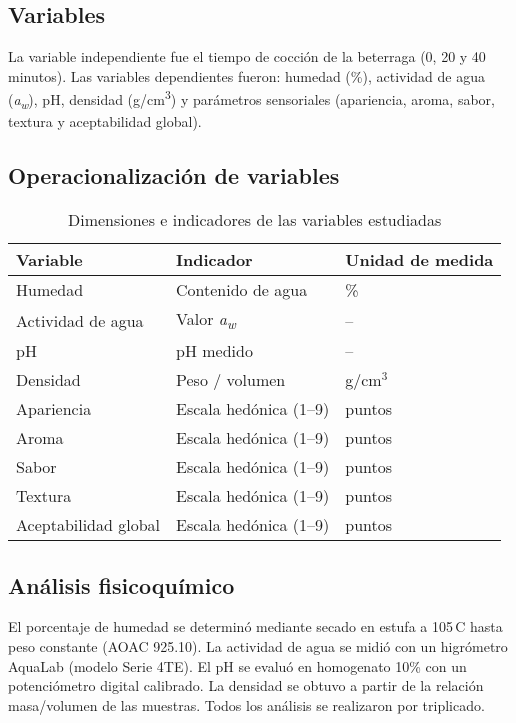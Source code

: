 \documentclass[manuscript,screen,review]{acmart}
\begin{document}
\subsection{Variables}
La variable independiente fue el tiempo de cocción de la beterraga (0, 20 y 40 minutos). Las variables dependientes fueron: humedad (\%), actividad de agua (\textit{a\textsubscript{w}}), pH, densidad (g/cm\textsuperscript{3}) y parámetros sensoriales (apariencia, aroma, sabor, textura y aceptabilidad global).

\subsection{Operacionalización de variables}
\begin{table}[htbp]
\centering
\caption{Dimensiones e indicadores de las variables estudiadas}
\begin{tabular}{lll}
\hline
\textbf{Variable} & \textbf{Indicador} & \textbf{Unidad de medida} \\
\hline
Humedad & Contenido de agua & \% \\
Actividad de agua & Valor \textit{a\textsubscript{w}} & -- \\
pH & pH medido & -- \\
Densidad & Peso / volumen & g/cm$^3$ \\
Apariencia & Escala hedónica (1--9) & puntos \\
Aroma & Escala hedónica (1--9) & puntos \\
Sabor & Escala hedónica (1--9) & puntos \\
Textura & Escala hedónica (1--9) & puntos \\
Aceptabilidad global & Escala hedónica (1--9) & puntos \\
\hline
\end{tabular}
\end{table}

\subsection{Análisis fisicoquímico}
El porcentaje de humedad se determinó mediante secado en estufa a 105\,\textdegree C hasta peso constante (AOAC 925.10). La actividad de agua se midió con un higrómetro AquaLab (modelo Serie 4TE). El pH se evaluó en homogenato 10\% con un potenciómetro digital calibrado. La densidad se obtuvo a partir de la relación masa/volumen de las muestras. Todos los análisis se realizaron por triplicado.
\end{document}

